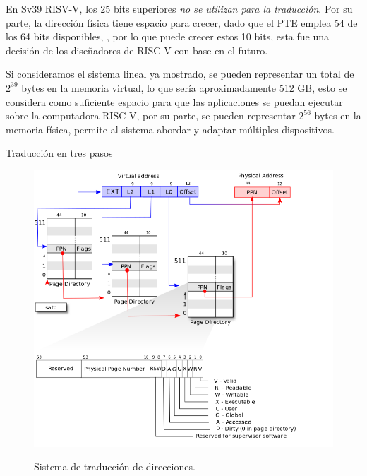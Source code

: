 \documentclass{libs/ufc_format}
\begin{document}
\begin{frame}{}
    En Sv39 RISV-V, los 25 bits superiores \emph{no se utilizan para la traducción}. Por su parte, la dirección física tiene espacio para crecer, dado que el PTE emplea 54 de los 64 bits disponibles, , por lo que puede crecer estos 10 bits, esta fue una decisión de los diseñadores de RISC-V con base en el futuro.

    \vspace{0.3cm}

    Si consideramos el sistema lineal ya mostrado, se pueden representar un total de $2^{39}$ bytes en la memoria virtual, lo que sería aproximadamente 512 GB, esto se considera como suficiente espacio para que las aplicaciones se puedan ejecutar sobre la computadora RISC-V, por su parte, se pueden representar $2^{56}$ bytes en la memoria física, permite al sistema abordar y adaptar múltiples dispositivos. \cite{xv6_book} \newline
\end{frame}
\begin{frame}{Traducción en tres pasos}
    \begin{figure}
        \centering
        \caption{Sistema de traducción de direcciones. \cite{xv6_book}}
        \includegraphics[scale=0.23]{libs/img/riscv_pagetable.png}
        \label{fig:sistema_arbol}
    \end{figure}
\end{frame}
\end{document}
